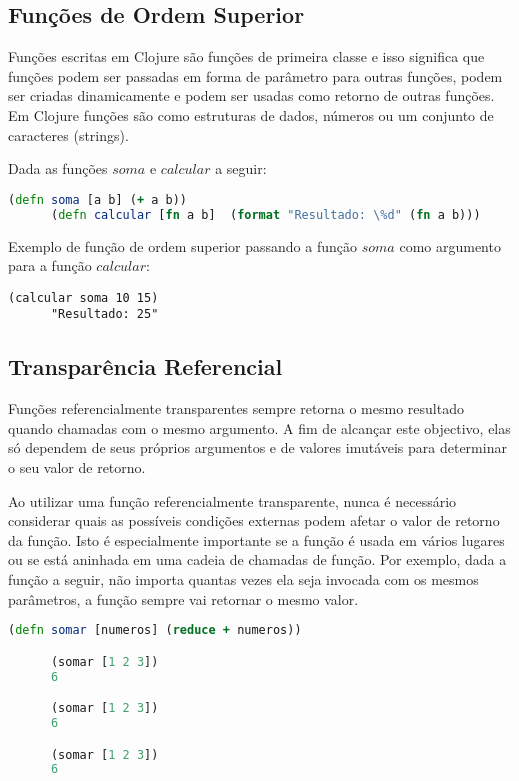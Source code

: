     \subsection{Funções de Ordem Superior}

    Funções escritas em Clojure são funções de primeira classe e isso significa que funções podem ser passadas em forma de parâmetro para outras funções, podem ser criadas dinamicamente e podem ser usadas como retorno de outras funções. Em Clojure funções são como estruturas de dados, números ou um conjunto de caracteres (strings).

    Dada as funções $soma$ e $calcular$ a seguir:

    \begin{lstlisting}[language=Clojure, mathescape=false]
      (defn soma [a b] (+ a b))
      (defn calcular [fn a b]  (format "Resultado: \%d" (fn a b)))
    \end{lstlisting}

    Exemplo de função de ordem superior passando a função $soma$ como argumento para a função $calcular$:

    \begin{lstlisting}[mathescape=false]
      (calcular soma 10 15)
      "Resultado: 25"
    \end{lstlisting}

    \subsection{Transparência Referencial}

    Funções referencialmente transparentes sempre retorna o mesmo resultado quando chamadas com o mesmo argumento. A fim de alcançar este objectivo, elas só dependem de seus próprios argumentos e de valores imutáveis ​​para determinar o seu valor de retorno.

    Ao utilizar uma função referencialmente transparente, nunca é necessário considerar quais as possíveis condições externas podem afetar o valor de retorno da função. Isto é especialmente importante se a função é usada em vários lugares ou se está aninhada em uma cadeia de chamadas de função. Por exemplo, dada a função a seguir, não importa quantas vezes ela seja invocada com os mesmos parâmetros, a função sempre vai retornar o mesmo valor.

    \begin{lstlisting}[language=Clojure, mathescape=false]
      (defn somar [numeros] (reduce + numeros))

      (somar [1 2 3])
      6

      (somar [1 2 3])
      6

      (somar [1 2 3])
      6
    \end{lstlisting}

